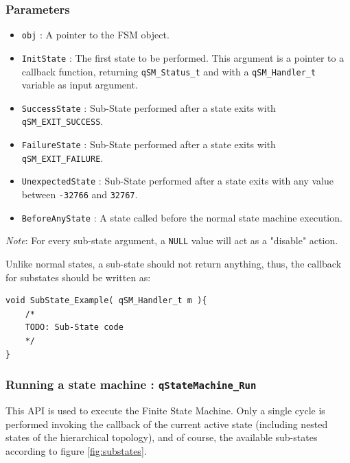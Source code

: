 \documentclass{article}
\begin{document}
\subsubsection*{Parameters}
\begin{itemize}
    \item \lstinline{obj} : A pointer to the FSM object.
    \item \lstinline{InitState} :  The first state to be performed. This argument is a pointer to a callback function, returning \lstinline{qSM_Status_t} and with a \lstinline{qSM_Handler_t} variable as input argument.
    \item \lstinline{SuccessState} :  Sub-State performed after a state exits with  \lstinline{qSM_EXIT_SUCCESS}. 
    \item \lstinline{FailureState} :  Sub-State performed after a state exits with  \lstinline{qSM_EXIT_FAILURE}. 
    \item \lstinline{UnexpectedState} :  Sub-State performed after a state exits with any value between \lstinline{-32766} and \lstinline{32767}. 
    \item \lstinline{BeforeAnyState} :  A state called before the normal state machine execution.
\end{itemize}  

\begin{tcolorbox}
\ArrowBoldDownRight \textit{Note}: For every sub-state argument, a \lstinline{NULL} value will act as a "disable" action.
\end{tcolorbox}

Unlike normal states, a sub-state should not return anything, thus, the callback for substates should be written as: \\

\begin{lstlisting}[style=CStyle]
void SubState_Example( qSM_Handler_t m ){
    /*
    TODO: Sub-State code
    */
}
\end{lstlisting}  

\subsubsection{Running a state machine : \lstinline{qStateMachine_Run} }
This API  is used to execute the Finite State Machine. Only a single cycle is performed invoking the callback of the current active state (including nested states of the hierarchical topology), and of course, the available sub-states according to figure \ref{fig:substates}. \\
\end{document}
